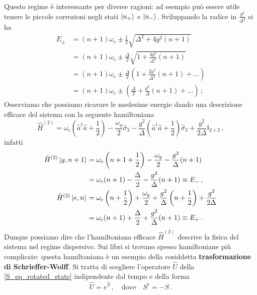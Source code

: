 \begin{itemize}
    \noindent Questo regime è interessante per diverse ragioni: ad esempio può essere utile tenere le piccole correzioni negli stati $\ket{n_+}$ e $\ket{n_-}$. Sviluppando la radice in $\frac{g^2}{\Delta^2}$ si ha
    \begin{align*}
        E_\pm &= (n+1)\omega_c \pm \frac 12 \sqrt{\Delta^2+4g^2(n+1)} \\
              &= (n+1)\omega_c \pm \frac{\Delta}{2} \sqrt{1+ \frac{4g^2}{\Delta^2}(n+1)} \\
              &= (n+1)\omega_c \pm \frac{\Delta}{2}\left(1+\frac{2g^2}{\Delta^2}(n+1)+\dots\right) \\
              &= (n+1)\omega_c \pm \left(\frac\Delta 2 +\frac{g^2}{\Delta}(n+1)+\dots\right) \, ;
    \end{align*}
    Osserviamo che possiamo ricavare le medesime energie dando una descrizione efficace del sistema con la seguente hamiltoniana
    \begin{equation}\label{eq:effective-hamiltonian}
        \hat H^{(2)}=\omega_c\left(\hat a^\dagger \hat a + \frac 12\right)-\frac{\omega_q}2\hat \sigma_3 - \frac{g^2}{\Delta}\left(\hat a^\dagger \hat a + \frac 12\right) \hat{\sigma}_3 + \frac{g^2}{2\Delta}\mathbb{I}_{2\times2} \, ,
    \end{equation}
    infatti
    \begin{align*}
        \hat H^{(2)}\ket{g, n+1} &= \omega_c\left(n+1+\frac 12\right)-\frac{\omega_q}{2}-\frac{g^2}{\Delta}(n+1) \\ 
        &= \omega_c(n+1)-\frac{\Delta}2 -\frac{g^2}\Delta(n+1) \equiv E_- \, , \\
        \hat H^{(2)}\ket{e,n} &= \omega_c\left(n+\frac 12\right) + \frac{\omega_q}2 + \frac{g^2}{\Delta}\left(n+ \frac 12\right) + \frac{g^2}{2\Delta} \\
        &= \omega_c(n+1)+\frac{\Delta}2 + \frac{g^2}\Delta(n+1) \equiv E_+ \, .
    \end{align*}
    Dunque possiamo dire che l'hamiltoniana efficace $\hat{H}^{(2)}$ descrive la fisica del sistema nel regime dispersivo. Sui libri si trovano spesso hamiltoniane più complicate: questa hamiltoniana è un esempio della cosiddetta \textbf{trasformazione di Schrieffer-Wolff}. Si tratta di scegliere l'operatore $\hat{U}$ della \eqref{S_eq_rotated_state} indipendente dal tempo e della forma 
    \begin{equation*}
        \hat U = e^{\hat{S}} \, , \quad \text{dove} \quad S^\dag = - S \, .
    \end{equation*}

\end{itemize}
